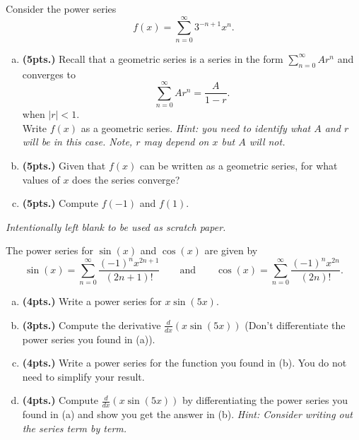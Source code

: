 \documentclass[12pt]{amsbook}
\begin{document}
\newpage
\begin{problem}
Consider the power series 
\[
f(x) = \sum_{n=0}^\infty 3^{-n+1}x^n.
\]
\begin{enumerate}[(a)]
    \item \textbf{(5pts.)} Recall that a geometric series is a series in the form $\displaystyle{\sum_{n=0}^\infty Ar^n}$  and converges to
    \[
    \sum_{n=0}^\infty Ar^n = \frac{A}{1-r}.
    \]
    when $|r|<1$.\\
    
    \noindent Write $f(x)$ as a geometric series. \emph{Hint: you need to identify what $A$ and $r$ will be in this case. Note, $r$ may depend on $x$ but $A$ will not.}
    \vspace*{5cm}
    \item \textbf{(5pts.)} Given that $f(x)$ can be written as a geometric series, for what values of $x$ does the series converge?
    \vspace*{5cm}
    \item \textbf{(5pts.)} Compute $f(-1)$ and $f(1)$.
\end{enumerate}
\end{problem}

\newpage
\emph{Intentionally left blank to be used as scratch paper.}\\


\newpage
\begin{problem}
The power series for $\sin(x)$ and $\cos(x)$ are given by
\[
\sin(x) = \sum_{n=0}^\infty \frac{(-1)^n x^{2n+1}}{(2n+1)!} \qquad \textrm{and} \qquad \cos(x)=\sum_{n=0}^\infty \frac{(-1)^n x^{2n}}{(2n)!}.
\]
\begin{enumerate}[(a)]
    \item \textbf{(4pts.)} Write a power series for $x\sin\left( 5x\right)$.
    \vspace*{3cm}
    \item \textbf{(3pts.)} Compute the derivative $\frac{d}{dx}\left(x\sin \left(5x\right)\right)$ (Don't differentiate the power series you found in (a)).
    \vspace*{3cm}
    \item \textbf{(4pts.)} Write a power series for the function you found in (b). You do not need to simplify your result.
    \vspace*{4cm}
    \item \textbf{(4pts.)} Compute $\frac{d}{dx}\left(x\sin\left(5x \right)\right)$ by differentiating the power series you found in (a) and show you get the answer in (b). \emph{Hint: Consider writing out the series term by term.}
\end{enumerate}
\end{problem}
\end{document}
